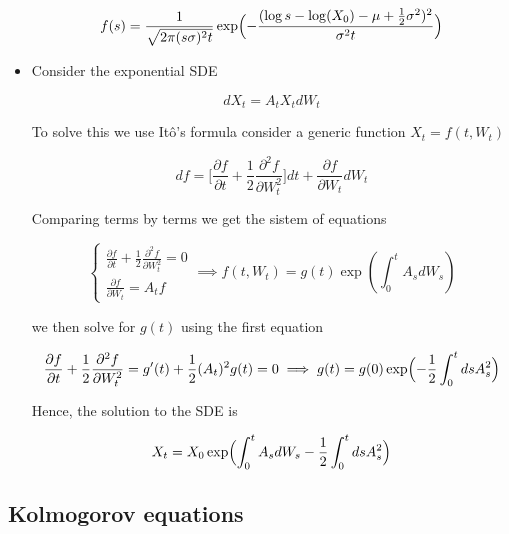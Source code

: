 \documentclass[11pt,a4paper]{article}
\begin{document}
\begin{itemize}
\begin{equation}
    f(s) = \frac{1}{\sqrt{2\pi (s\sigma)^2 t}} \exp\Bigl(-\frac{(\log s-\log(X_0)-\mu+\frac{1}{2}\sigma^2)^2}{\sigma^2 t}\Bigl)
\end{equation}


\item  Consider the exponential SDE

\begin{equation}
    dX_t = A_tX_t dW_t
\end{equation}

To solve this we use It\^{o}'s formula consider a generic function $X_t = f(t,W_t)$

\begin{equation}
    df = \Biggl[\frac{\partial f}{\partial t} + \frac{1}{2}\frac{\partial^2 f}{\partial W_t^2}\Biggl]dt + \frac{\partial f}{\partial W_t}dW_t
\end{equation}

Comparing terms by terms we get the sistem of equations

\begin{equation}
    \begin{cases}
        \frac{\partial f}{\partial t} + \frac{1}{2}\frac{\partial^2 f}{\partial W_t^2} = 0 \\
    \frac{\partial f}{\partial W_t}  = A_t f       
    \end{cases} \implies f(t,W_t) = g(t)\exp(\int_{0}^{t} A_sdW_s)
\end{equation}

we then solve for $g(t)$ using the first equation

\begin{equation}
    \frac{\partial f}{\partial t} + \frac{1}{2}\frac{\partial^2 f}{\partial W_t^2} =  g'(t) + \frac{1}{2}(A_t)^2g(t) = 0   \implies g(t) = g(0)\exp\Bigl(-\frac{1}{2}\int_{0}^{t} dsA^2_s \Bigl)
\end{equation}

Hence, the solution to the SDE is

\begin{equation}
    X_t = X_0 \exp\Bigl(\int_{0}^{t} A_sdW_s-\frac{1}{2}\int_{0}^{t} dsA^2_s \Bigl)
\end{equation}
\end{itemize}

\subsection{Kolmogorov equations}
\end{document}
